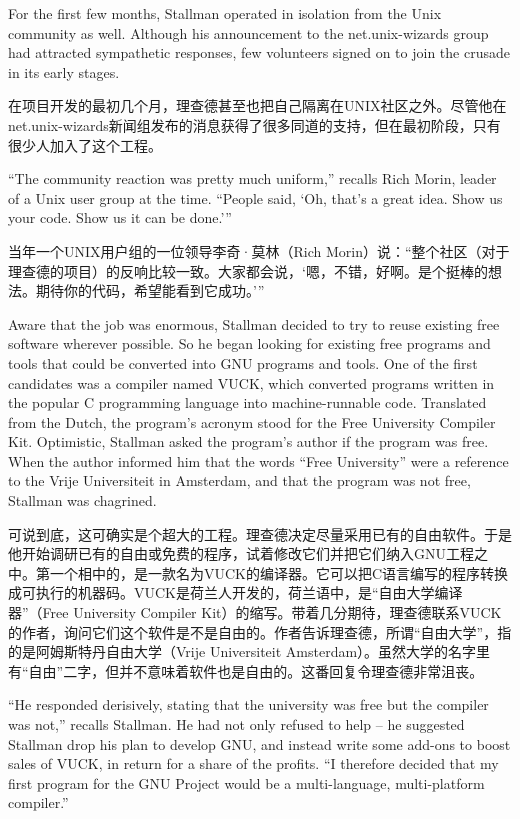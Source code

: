 \ifdefined\eng
For the first few months, Stallman operated in isolation from the Unix community as well. Although his announcement to the net.unix-wizards group had attracted sympathetic responses, few volunteers signed on to join the crusade in its early stages.
\fi

\ifdefined\chs
在项目开发的最初几个月，理查德甚至也把自己隔离在UNIX社区之外。尽管他在net.unix-wizards新闻组发布的消息获得了很多同道的支持，但在最初阶段，只有很少人加入了这个工程。
\fi

\ifdefined\eng
``The community reaction was pretty much uniform,'' recalls Rich Morin, leader of a Unix user group at the time. ``People said, `Oh, that's a great idea. Show us your code. Show us it can be done.'\hspace{0.01in}''
\fi

\ifdefined\chs
当年一个UNIX用户组的一位领导李奇·莫林（Rich
Morin）说：``整个社区（对于理查德的项目）的反响比较一致。大家都会说，`嗯，不错，好啊。是个挺棒的想法。期待你的代码，希望能看到它成功。'\hspace{0.01in}''
\fi

\ifdefined\eng
Aware that the job was enormous, Stallman decided to try to reuse existing free software wherever possible.  So he began looking for existing free programs and tools that could be converted into GNU programs and tools. One of the first candidates was a compiler named VUCK, which converted programs written in the popular C programming language into machine-runnable code. Translated from the Dutch, the program's acronym stood for the Free University Compiler Kit. Optimistic, Stallman asked the program's author if the program was free. When the author informed him that the words ``Free University'' were a reference to the Vrije Universiteit in Amsterdam, and that the program was not free, Stallman was chagrined.
\fi

\ifdefined\chs
可说到底，这可确实是个超大的工程。理查德决定尽量采用已有的自由软件。于是他开始调研已有的自由或免费的程序，试着修改它们并把它们纳入GNU工程之中。第一个相中的，是一款名为VUCK的编译器。它可以把C语言编写的程序转换成可执行的机器码。VUCK是荷兰人开发的，荷兰语中，是``自由大学编译器''（Free University Compiler Kit）的缩写。带着几分期待，理查德联系VUCK的作者，询问它们这个软件是不是自由的。作者告诉理查德，所谓``自由大学''，指的是阿姆斯特丹自由大学（Vrije Universiteit Amsterdam）。虽然大学的名字里有``自由''二字，但并不意味着软件也是自由的。这番回复令理查德非常沮丧。
\fi

\ifdefined\eng
``He responded derisively, stating that the university was free but the compiler was not,'' recalls Stallman. He had not only refused to help -- he suggested Stallman drop his plan to develop GNU, and instead write some add-ons to boost sales of VUCK, in return for a share of the profits. ``I therefore decided that my first program for the GNU Project would be a multi-language, multi-platform compiler.''
\fi

